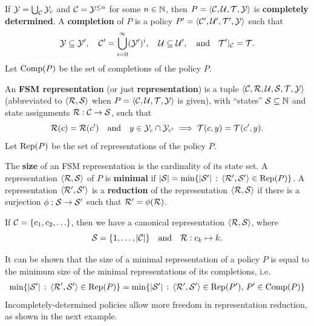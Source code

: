 \begin{definition}
If $\Y=\bigcup_\C\Y_c$ and $\C=\Y^{\leq n}$ for some $n\in\NN$, then $P=\ang{\C,\U,\T,\Y}$ is \textbf{completely determined}.
A \textbf{completion} of $P$ is a policy $P\1=\ang{\C\1, \U\1, \T\1, \Y}$ such that
\begin{equation}
\Y\subseteq\Y\1,\quad \C\1=\bigcup_{i=0}^{\infty}(\Y\1)^i,\quad \U\subseteq\U\1, \qtx{and} \T\1|_{\C} = \T.
\end{equation}
Let $\Comp(P)$ be the set of completions of the policy $P$.
\end{definition}
\begin{definition}
An \textbf{FSM representation} (or just \textbf{representation})
is a tuple $\ang{\C,\R,\U,\S,\T,\Y}$ (abbreviated to $\ang{\R,\S}$ when $P=\ang{\C,\U,\T,\Y}$ is given), 
with ``states'' $\S\subseteq\NN$ and state assignments $\R:\C\to\S$, such that 
\begin{equation}
\R(c)=\R(c\1)\qtx{and}y\in\Y_c\cap\Y_{c\1}\implies\T(c,y)=\T(c\1,y).
\end{equation} 
Let $\Rep(P)$ be the set of representations of the policy $P$.  
\end{definition}
\begin{definition}
The \textbf{size} of an FSM representation is the cardinality of its state set.  
A representation $\ang{\R,\S}$ of $P$ is \textbf{minimal} if 
$|\S|=\min\{|\S\1|\,:\,\ang{\R\1,\S\1}\in\Rep(P)\}$.
A representation $\ang{\R\1,\S\1}$ is a \textbf{reduction} of the representation $\ang{\R,\S}$ if there is a surjection $\phi:\S\to\S\1$
such that $\R\1 = \phi(\R)$.
\end{definition}
\begin{example}
\label{ex:canon}
If $\C = \{c_1, c_2, \ldots\}$, then 
we have a canonical representation $\ang{\R,\S}$, where
\begin{equation}
\S=\{1,\ldots,|\C|\}\qtx{and}\R:c_k\mapsto k.
\end{equation} 
\end{example}
It can be shown that the size of a minimal representation of a policy $P$ is equal to the minimum
size of the minimal representations of its completions, i.e.
\begin{align}
\min\{|\S\1|\,:\,\ang{\R\1,\S\1}\in\Rep(P)\} = \min\{|\S\1|\,:\,\ang{\R\1,\S\1}\in\Rep(P\1),\,P\1\in\Comp(P)\}
\end{align}
Incompletely-determined policies allow more freedom in representation reduction, as shown in the next example.

